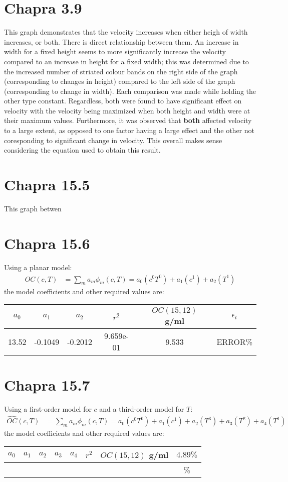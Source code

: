 \documentclass{article}
\begin{document}
\section{Chapra 3.9}
This graph demonstrates that the velocity increases when either heigh of width increases, or both. There is direct relationship between them. An increase in width for a fixed height seems to more significantly increase the velocity compared to an increase in height for a fixed width; this was determined due to the increased number of striated colour bands on the right side of the graph (corresponding to changes in height) compared to the left side of the graph (corresponding to change in width). Each comparison was made while holding the other type constant. Regardless, both were found to have significant effect on velocity with the velocity being maximized when both height and width were at their maximum values. Furthermore, it was observed that \textbf{both} affected velocity to a large extent, as opposed to one factor having a large effect and the other not coresponding to significant change in velocity. This overall makes sense considering the equation used to obtain this result.

\section{Chapra 15.5}
This graph betwen
\section{Chapra 15.6}
Using a planar model:
\begin{align*}
\hat{OC}(c, T)&=\sum_ma_m\phi_m(c,T)=a_0(c^0T^0)+a_1(c^1)+a_2(T^1)
\end{align*}
the model coefficients and other required values are:
\begin{center}
\begin{tabular}{c|c|c|c|c|c}
$a_0$ & $a_1$ & $a_2$ & $r^2$ & $OC(15, 12)$ g/ml & $\epsilon_t$ \\ \hline
 13.52 & -0.1049 &  -0.2012& 9.659e-01& 9.533 &  ERROR\%
\end{tabular}
\end{center}

\section{Chapra 15.7}
Using a first-order model for $c$ and a third-order model for $T$:
\begin{align*}
\hat{OC}(c, T)&=
\sum_ma_m\phi_m(c, T)=a_0(c^0T^0)+a_1(c^1)+a_2(T^3)+a_3(T^2)+a_4(T^1) 
\end{align*}
the model coefficients and other required values are:
\begin{center}
\begin{tabular}{c|c|c|c|c|c|c|c}
$a_0$ & $a_1$ & $a_2$ & $a_3$ & $a_4$ & $r^2$ & $OC(15, 12)$ g/ml & $4.89\%$ \\ \hline
 &  &  &  &  &  &  & \%
\end{tabular}
\end{center}
\end{document}
